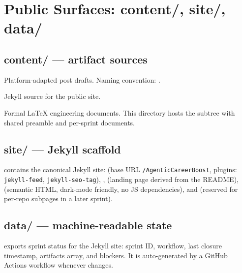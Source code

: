 \documentclass[a4paper,11pt,openany]{report}
\begin{document}
\chapter{Public Surfaces: content/, site/, data/}
\label{ch:surfaces}


\section{content/ --- artifact sources}

\begin{description}[style=nextline]
  \item[\pathref{content/social/}] Platform-adapted post drafts. Naming
    convention: .
  \item[\pathref{site/}] Jekyll source for the public site.
  \item[\pathref{content/reports/}] Formal \LaTeX{} engineering documents.
    This directory hosts the  subtree with shared preamble and
    per-sprint documents.
\end{description}

\section{site/ --- Jekyll scaffold}

 contains the canonical Jekyll site: 
(base URL \texttt{/AgenticCareerBoost}, plugins: \texttt{jekyll-feed},
\texttt{jekyll-seo-tag}), ,  (landing page
derived from the README),  (semantic HTML, dark-mode
friendly, no JS dependencies), and  (reserved for
per-repo subpages in a later sprint).

\section{data/ --- machine-readable state}

 exports sprint status for the Jekyll site:
sprint ID, workflow, last closure timestamp, artifacts array, and blockers.
It is auto-generated by a GitHub Actions workflow whenever 
changes.
\end{document}

